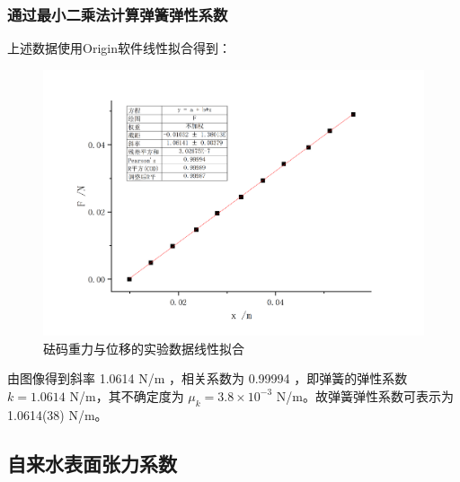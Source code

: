 \documentclass[a4paper]{extarticle}
\begin{document}
    \subsubsection{通过最小二乘法计算弹簧弹性系数}
    \hspace{2em}
    上述数据使用Origin软件线性拟合得到：
    \begin{figure}[H]
        \centering
        \includegraphics[width=0.8\linewidth]{1.png}
        \caption{砝码重力与位移的实验数据线性拟合}
    \end{figure}
    由图像得到斜率 1.0614 N/m ，相关系数为 0.99994 ，即弹簧的弹性系数 $k =1.0614$ N/m，其不确定度为 $\mu_k=3.8\times 10^{-3}$ N/m。故弹簧弹性系数可表示为 1.0614(38) N/m。
    \subsection{自来水表面张力系数}
\end{document}
